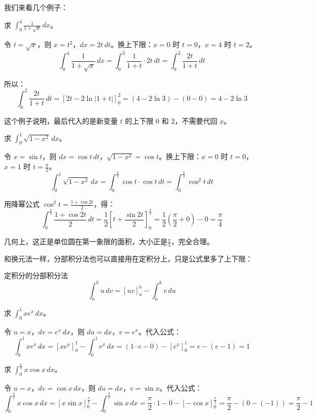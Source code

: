 我们来看几个例子：

\begin{myexample}
  求 $\int_0^4 \frac{1}{1+\sqrt{x}}\, dx$。

  令 $t = \sqrt{x}$，则 $x = t^2$，$dx = 2t\, dt$。换上下限：$x = 0$ 时 $t = 0$，$x = 4$ 时 $t = 2$。
  \[
  \int_0^4 \frac{1}{1+\sqrt{x}}\, dx = \int_0^2 \frac{1}{1+t} \cdot 2t\, dt = \int_0^2 \frac{2t}{1+t}\, dt
  \]

  所以：
  \[
  \int_0^2 \frac{2t}{1+t}\, dt = [2t - 2\ln|1+t|]_0^2 = (4 - 2\ln 3) - (0 - 0) = 4 - 2\ln 3
  \]
\end{myexample}

这个例子说明，最后代入的是新变量 $t$ 的上下限 $0$ 和 $2$，不需要代回 $x$。

\begin{myexample}
  求 $\int_0^1 \sqrt{1-x^2}\, dx$。

  令 $x = \sin t$，则 $dx = \cos t\, dt$，$\sqrt{1-x^2} = \cos t$。换上下限：$x = 0$ 时 $t = 0$，$x = 1$ 时 $t = \frac{\pi}{2}$。
  \[
  \int_0^1 \sqrt{1-x^2}\, dx = \int_0^{\frac{\pi}{2}} \cos t \cdot \cos t\, dt = \int_0^{\frac{\pi}{2}} \cos^2 t\, dt
  \]

  用降幂公式 $\cos^2 t = \frac{1+\cos 2t}{2}$，得：
  \[
  \int_0^{\frac{\pi}{2}} \frac{1+\cos 2t}{2}\, dt = \frac{1}{2}[t + \frac{\sin 2t}{2}]_0^{\frac{\pi}{2}} = \frac{1}{2}(\frac{\pi}{2} + 0) - 0 = \frac{\pi}{4}
  \]
\end{myexample}
  
  几何上，这正是单位圆在第一象限的面积，大小正是$\frac{\pi}{4}$，完全合理。

和换元法一样，分部积分法也可以直接用在定积分上，只是公式里多了上下限：

\begin{theorem}{定积分的分部积分法}{}
\[
\int_a^b u\, dv = [uv]_a^b - \int_a^b v\, du
\]
\end{theorem}

\begin{myexample}
  求 $\int_0^1 x e^x\, dx$。

  令 $u = x$，$dv = e^x\, dx$，则 $du = dx$，$v = e^x$。代入公式：
  \[
  \int_0^1 x e^x\, dx = [xe^x]_0^1 - \int_0^1 e^x\, dx = (1 \cdot e - 0) - [e^x]_0^1 = e - (e - 1) = 1
  \]
\end{myexample}

\begin{myexample}
  求 $\int_0^{\frac{\pi}{2}} x \cos x\, dx$。

  令 $u = x$，$dv = \cos x\, dx$，则 $du = dx$，$v = \sin x$。代入公式：
  \[
  \int_0^{\frac{\pi}{2}} x \cos x\, dx = [x\sin x]_0^{\frac{\pi}{2}} - \int_0^{\frac{\pi}{2}} \sin x\, dx = \frac{\pi}{2} \cdot 1 - 0 - [-\cos x]_0^{\frac{\pi}{2}} = \frac{\pi}{2} - (0 - (-1)) = \frac{\pi}{2} - 1
  \]
\end{myexample}

